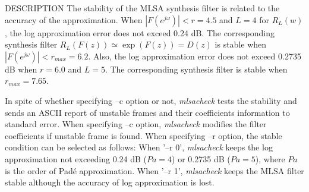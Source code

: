 \begin{qsection}{DESCRIPTION}
 The stability of the MLSA synthesis filter
 is related to the accuracy of the approximation.
 When \begin{math} |F(e^{j\omega})| < r = 4.5 \end{math} and
 \begin{math} L = 4 \end{math}
 for \begin{math} R_{L}(w)\end{math},
 the log approximation error does not exceed 0.24 dB.
 The corresponding synthesis filter
 \begin{math} R_{L}(F(z))\simeq \exp(F(z))=D(z)\end{math}
 is stable when \begin{math} |F(e^{j\omega})| < r_{max} = 6.2 \end{math}.
 Also, the log approximation error does not exceed 0.2735 dB
 when \begin{math} r = 6.0 \end{math} and
 \begin{math}L = 5 \end{math}.
 The corresponding synthesis filter is stable
 when \begin{math}r_{max} = 7.65 \end{math}.

 In spite of whether specifying --c option or not,
 {\em mlsacheck} tests the stability and sends an ASCII report of unstable frames and
 their coefficients information to standard error.
 When specifying --c option,
 {\em mlsacheck} modifies the filter coefficients
 if unstable frame is found.
 When specifying --r option,
 the stable condition can be selected as follows:
 When '--r 0', {\em mlsacheck} keeps the log approximation
 not exceeding 0.24 dB ($Pa=4$) or 0.2735 dB ($Pa=5$),
 where $Pa$ is the order of Pad\'e approximation.
 When '--r 1', {\em mlsacheck} keeps the MLSA filter stable
 although the accuracy of log approximation is lost.
\end{qsection}

\begin{options}
\end{options}

